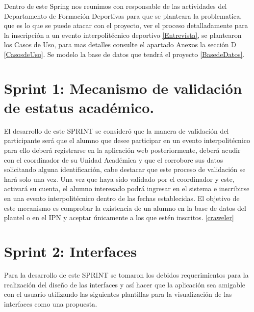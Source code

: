 	\noindent Dentro de este Spring nos reunimos con responsable de las actividades del Departamento de Formación Deportivas para que se planteara la problematica, que es lo que se puede atacar con el proyecto, ver el proceso detalladamente para la inscripción a un evento interpolitécnico deportivo \ref{Entrevista}, se plantearon los Casos de Uso, para mas detalles consulte el apartado Anexos la sección D \ref{CasosdeUso}. Se modelo la base de datos que tendrá el proyecto \ref{BasedeDatos}. 
	\pagebreak
	
	\section{Sprint 1:  Mecanismo de validación de estatus académico.}
	\noindent El desarrollo de este SPRINT se consideró que la manera de validación del participante será que el alumno que desee participar en un evento interpolitécnico para ello deberá registrarse en la aplicación web posteriormente, deberá acudir con el coordinador de su Unidad Académica y que el corrobore sus datos solicitando alguna identificación, cabe destacar que este proceso de validación se hará solo una vez.
	Una vez que haya sido validado por el coordinador y este, activará su cuenta, el alumno interesado podrá ingresar en el sistema e inscribirse en una evento interpolitécnico dentro de las fechas establecidas.
	El objetivo de este mecanismo es comprobar la existencia de un alumno en la base de datos del plantel o en el IPN y aceptar únicamente a los que estén inscritos. \ref{craweler}
	
	
	\section{Sprint 2: Interfaces}
	\noindent Para la desarrollo de este SPRINT se tomaron los debidos requerimientos para la realización del diseño de las interfaces y así hacer que la aplicación sea amigable con el usuario utilizando las siguientes plantillas para la visualización de las interfaces como una propuesta.
	\newline
	
